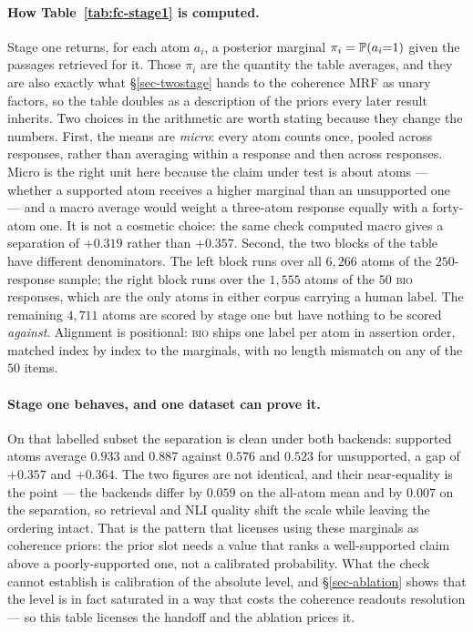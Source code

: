 \paragraph{How Table~\ref{tab:fc-stage1} is computed.} Stage one returns, for each atom $a_i$, a
posterior marginal $\pi_i = \mathbb{P}\!\left( a_i{=}1 \right)$ given the passages retrieved for it. Those $\pi_i$ are the
quantity the table averages, and they are also exactly what \S\ref{sec-twostage} hands to the coherence
MRF as unary factors, so the table doubles as a description of the priors every later result inherits.
Two choices in the arithmetic are worth stating because they change the numbers. First, the means are
\emph{micro}: every atom counts once, pooled across responses, rather than averaging within a response
and then across responses. Micro is the right unit here because the claim under test is about atoms ---
whether a supported atom receives a higher marginal than an unsupported one --- and a macro average would
weight a three-atom response equally with a forty-atom one. It is not a cosmetic choice: the same check
computed macro gives a separation of $+0.319$ rather than $+0.357$. Second, the two blocks of the table
have different denominators. The left block runs over all $6{,}266$ atoms of the $250$-response sample;
the right block runs over the $1{,}555$ atoms of the $50$ \textsc{bio} responses, which are the only
atoms in either corpus carrying a human label. The remaining $4{,}711$ atoms are scored by stage one but
have nothing to be scored \emph{against}. Alignment is positional: \textsc{bio} ships one label per atom
in assertion order, matched index by index to the marginals, with no length mismatch on any of the $50$
items.

\paragraph{Stage one behaves, and one dataset can prove it.} On that labelled subset the separation is
clean under both backends: supported atoms average $0.933$ and $0.887$ against $0.576$ and $0.523$ for
unsupported, a gap of $+0.357$ and $+0.364$. The two figures are not identical, and their near-equality
is the point --- the backends differ by $0.059$ on the all-atom mean and by $0.007$ on the separation, so
retrieval and NLI quality shift the scale while leaving the ordering intact. That is the pattern that
licenses using these marginals as coherence priors: the prior slot needs a value that ranks a
well-supported claim above a poorly-supported one, not a calibrated probability. What the check cannot
establish is calibration of the absolute level, and \S\ref{sec-ablation} shows that the level is in fact
saturated in a way that costs the coherence readouts resolution --- so this table licenses the handoff
and the ablation prices it.

